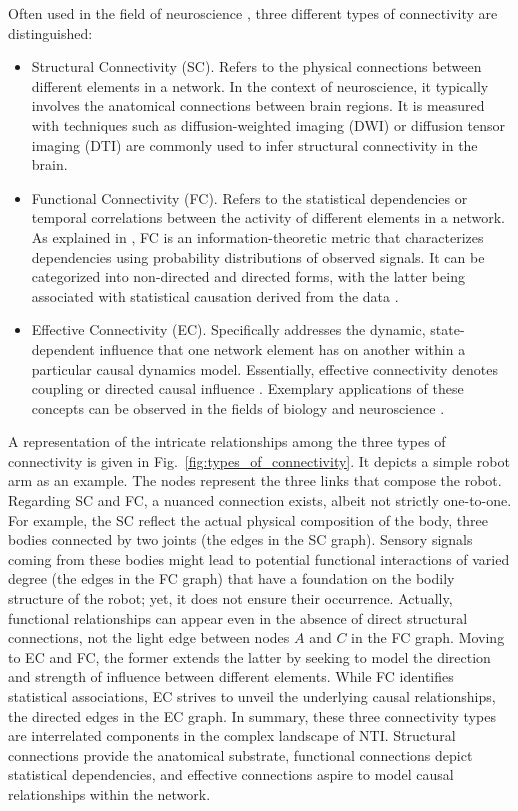 Often used in the field of neuroscience \cite{Karwowski2019Applicationgraphtheory}, three different types of connectivity are distinguished\cite{Park2013Structuralfunctionalbrain,FaskowitzEdgesbrainnetworks}:
\begin{itemize}
	\item Structural Connectivity (SC). Refers to the physical connections between different elements in a network. In the context of neuroscience, it typically involves the anatomical connections between brain regions. It is measured with techniques such as diffusion-weighted imaging (DWI) or diffusion tensor imaging (DTI) are commonly used to infer structural connectivity in the brain.
	\item Functional Connectivity (FC). Refers to the statistical dependencies or temporal correlations between the activity of different elements in a network. As explained in \cite{Friston2011Functionaleffectiveconnectivity}, FC is an information-theoretic metric that characterizes dependencies using probability distributions of observed signals. It can be categorized into non-directed and directed forms, with the latter being associated with statistical causation derived from the data \cite{Bastos2016tutorialreviewfunctional}.
	\item Effective Connectivity (EC). Specifically addresses the dynamic, state-dependent influence that one network element has on another within a particular causal dynamics model. Essentially, effective connectivity denotes coupling or directed causal influence \cite{Park2013Structuralfunctionalbrain}. Exemplary applications of these concepts can be observed in the fields of biology \cite{Zhang2017Networkbasedmachine} and neuroscience \cite{Karwowski2019Applicationgraphtheory,Sporns2018Graphtheorymethods}.
\end{itemize}

A representation of the intricate relationships among the three types of connectivity is given in Fig.~\ref{fig:types_of_connectivity}. It depicts a simple robot arm as an example. The nodes represent the three links that compose the robot. Regarding SC and FC, a nuanced connection exists, albeit not strictly one-to-one. For example, the SC reflect the actual physical composition of the body, three bodies connected by two joints (the edges in the SC graph). Sensory signals coming from these bodies might lead to potential functional interactions of varied degree (the edges in the FC graph) that have a foundation on the bodily structure of the robot; yet, it does not ensure their occurrence. Actually, functional relationships can appear even in the absence of direct structural connections, not the light edge between nodes $A$ and $C$ in the FC graph. Moving to EC and FC, the former extends the latter by seeking to model the direction and strength of influence between different elements. While FC identifies statistical associations, EC strives to unveil the underlying causal relationships, the directed edges in the EC graph. In summary, these three connectivity types are interrelated components in the complex landscape of NTI. Structural connections provide the anatomical substrate, functional connections depict statistical dependencies, and effective connections aspire to model causal relationships within the network.


